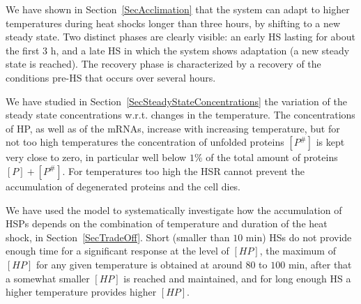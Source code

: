 \documentclass[oneside, 10pt, a4paper, twocolumn]{article}
\begin{document}
We have shown in Section~\ref{SecAcclimation} that the system can adapt to higher temperatures during heat shocks longer than three hours, by shifting to a new steady state. Two distinct phases are clearly visible: an early HS lasting for about the first $3$ h, and a late HS in which the system shows adaptation (a new steady state is reached). The recovery phase is characterized by a recovery of the conditions pre-HS that occurs over several hours. 
 
We have studied in Section~\ref{SecSteadyStateConcentrations} the variation of the steady state concentrations w.r.t. changes in the temperature. The concentrations of HP, as well as of the mRNAs, increase with increasing temperature, but for not too high temperatures the concentration of unfolded proteins $\left[P^\#\right]$ is kept very close to zero, in particular well below $1\%$ of the total amount of proteins $\left[P\right] + \left[P^\#\right]$. For temperatures too high the HSR cannot prevent the accumulation of degenerated proteins and the cell dies.

We have used the model to systematically investigate how the accumulation of HSPs depends on the combination of temperature and duration of the heat shock, in Section~\ref{SecTradeOff}. Short (smaller than $10$ min) HSs do not provide enough time for a significant response at the level of $\left[HP\right]$, the maximum of $\left[HP\right]$ for any given temperature is obtained at around $80$ to $100$ min, after that a somewhat smaller $\left[HP\right]$ is reached and maintained, and for long enough HS a higher temperature provides higher $\left[HP\right]$.




\end{document}
